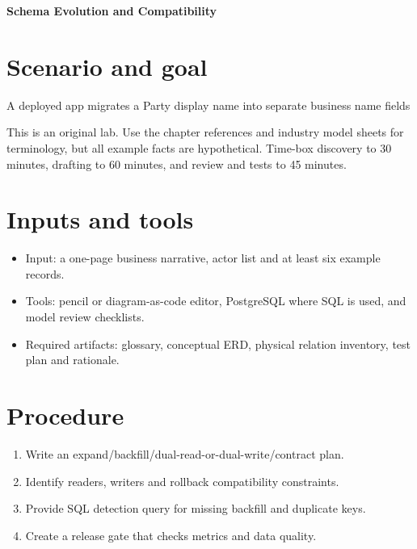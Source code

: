 \documentclass[11pt,letterpaper]{article}
\begin{document}
\begin{center}
{\LARGE\bfseries\color{navy} Schema Evolution and Compatibility}\par
\vspace{0.25em}{\large Practical modeling laboratory}\par
{}
\end{center}
\vspace{0.8em}
\section{Scenario and goal}
A deployed app migrates a Party display name into separate business name fields

This is an original lab. Use the chapter references and industry model sheets for terminology, but all example facts are hypothetical. Time-box discovery to 30 minutes, drafting to 60 minutes, and review and tests to 45 minutes.


\section{Inputs and tools}
\begin{itemize}
\item Input: a one-page business narrative, actor list and at least six example records.
\item Tools: pencil or diagram-as-code editor, PostgreSQL where SQL is used, and model review checklists.
\item Required artifacts: glossary, conceptual ERD, physical relation inventory, test plan and rationale.
\end{itemize}

\section{Procedure}
\begin{enumerate}
\item Write an expand/backfill/dual-read-or-dual-write/contract plan.
\item Identify readers, writers and rollback compatibility constraints.
\item Provide SQL detection query for missing backfill and duplicate keys.
\item Create a release gate that checks metrics and data quality.
\end{enumerate}
\end{document}
